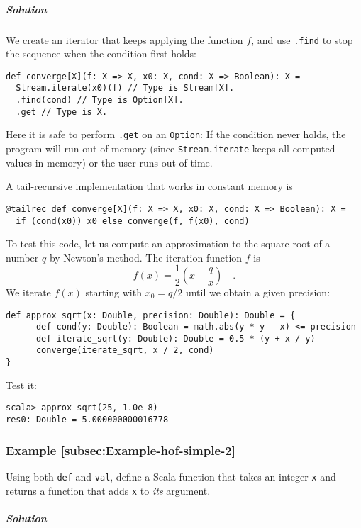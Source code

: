 \subparagraph{Solution}

We create an iterator that keeps applying the function $f$, and use
\lstinline!.find! to stop the sequence when the condition first holds:
\begin{lstlisting}
def converge[X](f: X => X, x0: X, cond: X => Boolean): X = 
  Stream.iterate(x0)(f) // Type is Stream[X].
  .find(cond) // Type is Option[X].
  .get // Type is X.
\end{lstlisting}
Here it is safe to perform \lstinline!.get! on an \lstinline!Option!:
If the condition never holds, the program will run out of memory (since
\lstinline!Stream.iterate! keeps all computed values in memory) or
the user runs out of time.

A tail-recursive implementation that works in constant memory is 
\begin{lstlisting}
@tailrec def converge[X](f: X => X, x0: X, cond: X => Boolean): X =
  if (cond(x0)) x0 else converge(f, f(x0), cond)
\end{lstlisting}

To test this code, let us compute an approximation to the square root
of a number $q$ by Newton's method. The iteration function $f$ is
\[
f(x)=\frac{1}{2}\left(x+\frac{q}{x}\right)\quad.
\]
We iterate $f(x)$ starting with $x_{0}=q/2$ until we obtain a given
precision:
\begin{lstlisting}
def approx_sqrt(x: Double, precision: Double): Double = {
      def cond(y: Double): Boolean = math.abs(y * y - x) <= precision
      def iterate_sqrt(y: Double): Double = 0.5 * (y + x / y)
      converge(iterate_sqrt, x / 2, cond)
}
\end{lstlisting}
Test it:
\begin{lstlisting}
scala> approx_sqrt(25, 1.0e-8)
res0: Double = 5.000000000016778
\end{lstlisting}


\subsubsection{Example \label{subsec:Example-hof-simple-2}\ref{subsec:Example-hof-simple-2}}

Using both \lstinline!def! and \lstinline!val!, define a Scala function
that takes an integer \lstinline!x! and returns a function that adds
\lstinline!x! to \emph{its} argument.

\subparagraph{Solution}

